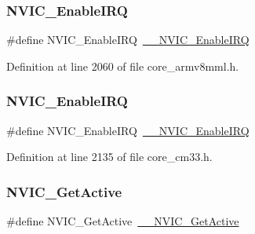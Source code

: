 \subsubsection{\texorpdfstring{N\+V\+I\+C\+\_\+\+Enable\+I\+RQ}{NVIC\_EnableIRQ}\hspace{0.1cm}{\footnotesize\ttfamily [12/13]}}
{\footnotesize\ttfamily \#define N\+V\+I\+C\+\_\+\+Enable\+I\+RQ~\hyperlink{group___c_m_s_i_s___core___n_v_i_c_functions_ga71227e1376cde11eda03fcb62f1b33ea}{\+\_\+\+\_\+\+N\+V\+I\+C\+\_\+\+Enable\+I\+RQ}}



Definition at line 2060 of file core\+\_\+armv8mml.\+h.

\mbox{\label{group___c_m_s_i_s___core___n_v_i_c_functions_ga57b3064413dbc7459d9646020fdd8bef}} 
\subsubsection{\texorpdfstring{N\+V\+I\+C\+\_\+\+Enable\+I\+RQ}{NVIC\_EnableIRQ}\hspace{0.1cm}{\footnotesize\ttfamily [13/13]}}
{\footnotesize\ttfamily \#define N\+V\+I\+C\+\_\+\+Enable\+I\+RQ~\hyperlink{group___c_m_s_i_s___core___n_v_i_c_functions_ga71227e1376cde11eda03fcb62f1b33ea}{\+\_\+\+\_\+\+N\+V\+I\+C\+\_\+\+Enable\+I\+RQ}}



Definition at line 2135 of file core\+\_\+cm33.\+h.

\mbox{\label{group___c_m_s_i_s___core___n_v_i_c_functions_ga58ad3f352f832235ab3b192ff4745320}} 
\subsubsection{\texorpdfstring{N\+V\+I\+C\+\_\+\+Get\+Active}{NVIC\_GetActive}\hspace{0.1cm}{\footnotesize\ttfamily [1/9]}}
{\footnotesize\ttfamily \#define N\+V\+I\+C\+\_\+\+Get\+Active~\hyperlink{group___c_m_s_i_s___core___n_v_i_c_functions_gaa2837003c28c45abf193fe5e8d27f593}{\+\_\+\+\_\+\+N\+V\+I\+C\+\_\+\+Get\+Active}}



